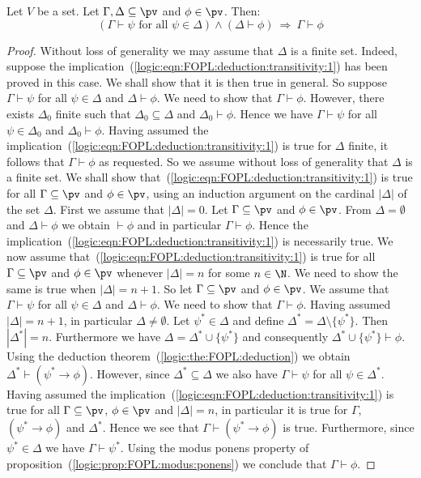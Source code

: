 \begin{prop}\label{logic:prop:FOPL:deduction:transitivity}
Let $V$ be a set. Let $\Gamma,\Delta\subseteq\pv$ and $\phi\in\pv$.
Then:
    \begin{equation}\label{logic:eqn:FOPL:deduction:transitivity:1}
    (\Gamma\vdash\psi
    \mbox{\ for all\ }\psi\in\Delta)\land(\Delta\vdash\phi)\ \Rightarrow\
    \Gamma\vdash\phi
    \end{equation}
\end{prop}
\begin{proof}
Without loss of generality we may assume that $\Delta$ is a finite
set. Indeed, suppose the
implication~(\ref{logic:eqn:FOPL:deduction:transitivity:1}) has been
proved in this case. We shall show that it is then true in general.
So suppose $\Gamma\vdash\psi$ for all $\psi\in\Delta$ and
$\Delta\vdash\phi$. We need to show that $\Gamma\vdash\phi$.
However, there exists $\Delta_{0}$ finite such that
$\Delta_{0}\subseteq\Delta$ and $\Delta_{0}\vdash\phi$. Hence we
have $\Gamma\vdash\psi$ for all $\psi\in\Delta_{0}$ and
$\Delta_{0}\vdash\phi$. Having assumed the
implication~(\ref{logic:eqn:FOPL:deduction:transitivity:1}) is true
for $\Delta$ finite, it follows that $\Gamma\vdash\phi$ as
requested. So we assume without loss of generality that $\Delta$ is
a finite set. We shall show
that~(\ref{logic:eqn:FOPL:deduction:transitivity:1}) is true for all
$\Gamma\subseteq\pv$ and $\phi\in\pv$, using an induction argument
on the cardinal $|\Delta|$ of the set $\Delta$. First we assume that
$|\Delta|=0$. Let $\Gamma\subseteq\pv$ and $\phi\in\pv$. From
$\Delta=\emptyset$ and $\Delta\vdash\phi$ we obtain $\vdash\phi$ and
in particular $\Gamma\vdash\phi$. Hence the
implication~(\ref{logic:eqn:FOPL:deduction:transitivity:1}) is
necessarily true. We now assume
that~(\ref{logic:eqn:FOPL:deduction:transitivity:1}) is true for all
$\Gamma\subseteq\pv$ and $\phi\in\pv$ whenever $|\Delta|=n$ for some
$n\in\N$. We need to show the same is true when $|\Delta|=n+1$. So
let $\Gamma\subseteq\pv$ and $\phi\in\pv$. We assume that
$\Gamma\vdash\psi$ for all $\psi\in\Delta$ and $\Delta\vdash\phi$.
We need to show that $\Gamma\vdash\phi$. Having assumed
$|\Delta|=n+1$, in particular $\Delta\neq\emptyset$. Let
$\psi^{*}\in\Delta$ and define
$\Delta^{*}=\Delta\setminus\{\psi^{*}\}$. Then $|\Delta^{*}|=n$.
Furthermore we have $\Delta=\Delta^{*}\cup\{\psi^{*}\}$ and
consequently $\Delta^{*}\cup\{\psi^{*}\}\vdash\phi$. Using the
deduction theorem~(\ref{logic:the:FOPL:deduction}) we obtain
$\Delta^{*}\vdash(\psi^{*}\to\phi)$. However, since
$\Delta^{*}\subseteq\Delta$ we also have $\Gamma\vdash\psi$ for all
$\psi\in\Delta^{*}$. Having assumed the
implication~(\ref{logic:eqn:FOPL:deduction:transitivity:1}) is true
for all $\Gamma\subseteq\pv$, $\phi\in\pv$ and $|\Delta|=n$, in
particular it is true for $\Gamma$, $(\psi^{*}\to\phi)$ and
$\Delta^{*}$. Hence we see that $\Gamma\vdash(\psi^{*}\to\phi)$ is
true. Furthermore, since $\psi^{*}\in\Delta$ we have
$\Gamma\vdash\psi^{*}$. Using the modus ponens property of
proposition~(\ref{logic:prop:FOPL:modus:ponens}) we conclude that
$\Gamma\vdash\phi$.
\end{proof}

